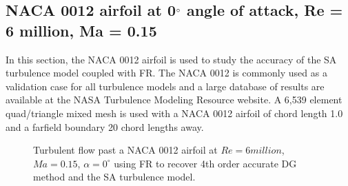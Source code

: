\graphicspath{{figures_RANS_naca0012/}}%

\subsection{NACA 0012 airfoil at 0$^{\circ}$ angle of attack, Re = 6 million, Ma = 0.15}
In this section, the NACA 0012 airfoil is used to study the accuracy of the SA turbulence model coupled with FR. The NACA 0012 is commonly used as a validation case for all turbulence models and a large database of results are available at the NASA Turbulence Modeling Resource website. A 6,539 element quad/triangle mixed mesh is used with a NACA 0012 airfoil of chord length 1.0 and a farfield boundary 20 chord lengths away.

\begin{figure}
  \begin{subfigmatrix}{2}
  \end{subfigmatrix}
  \caption{Turbulent flow past a NACA 0012 airfoil at $Re = 6 million$, $Ma = 0.15$, $\alpha = 0^{\circ}$ using FR to recover 4th order accurate DG method and the SA turbulence model.}
  \label{RANS_naca0012}
\end{figure}